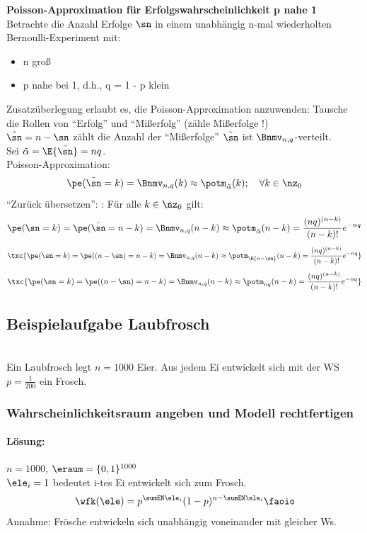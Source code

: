 
\begin{lem}
    \textbf{Poisson-Approximation für Erfolgswahrscheinlichkeit p nahe 1}  \\
    Betrachte die Anzahl Erfolge $\sn$ in einem unabhängig n-mal wiederholten
    Bernoulli-Experiment mit:
    \begin{itemize}
        \item n groß
        \item p nahe bei 1, d.h., q = 1 - p klein
    \end{itemize}
    Zusatzüberlegung erlaubt es, die Poisson-Approximation anzuwenden:
    Tausche die Rollen von ``Erfolg'' und ``Mißerfolg'' (zähle Mißerfolge !)\\
    $\tilde\sn = n - \sn$ zählt die Anzahl der ``Mißerfolge''  $\tilde\sn$ ist $\Bnmv_{n,q}$-verteilt. \\
    Sei $\tilde \alpha = \E{\tilde\sn} = nq$. \\
    Poisson-Approximation:
    \[
        \pe(\tilde\sn = k) = \Bnmv_{n,q}(k) \approx \potm_{\tilde\alpha}(k); \quad \forall k \in \nz_0
    \]
    ``Zurück übersetzen'': : Für alle $k \in \nz_0$ gilt:
    \[
        \pe(\sn = k) = \pe( \tilde\sn = n - k) = \Bnmv_{n,q}(n - k) \approx \potm_{\tilde\alpha}(n - k) = \frac{(nq)^{(n-k)}}{(n - k)!} e^{-nq}
    \]
    \[
        \txc{\pe(\sn = k) = \pe( (n - \sn) = n - k) = \Bnmv_{n,q}(n - k) \approx \potm_{\E{n - \sn}}(n - k) = \frac{(nq)^{(n-k)}}{(n - k)!} e^{-nq}}
    \]
    \[
        \txc{\pe(\sn = k) = \pe( (n - \sn) = n - k) = \Bnmv_{n,q}(n - k) \approx \potm_{nq}(n - k) = \frac{(nq)^{(n-k)}}{(n - k)!} e^{-nq}}
    \]
\end{lem}
\subsection{Beispielaufgabe Laubfrosch}  \\
Ein Laubfrosch legt $n = 1000$ Eier.
Aus jedem Ei entwickelt sich mit der WS $p = \frac{1}{200}$ ein Frosch.
\begin{auf}
    \subsubsection*{Wahrscheinlichkeitsraum angeben und Modell rechtfertigen}
    \paragraph{Lösung:} $n = 1000$, $\eraum = \{0,1\}^{1000}$\\
    $\ele_i = 1$ bedeutet i-tes Ei entwickelt sich zum Frosch.
    \[
        \wfk(\ele) = p^{\sumEN \ele_i} (1-p)^{n- \sumEN \ele_i}  \faoio
    \]
    Annahme: Frösche entwickeln sich unabhängig voneinander mit gleicher Ws.
\end{auf}

